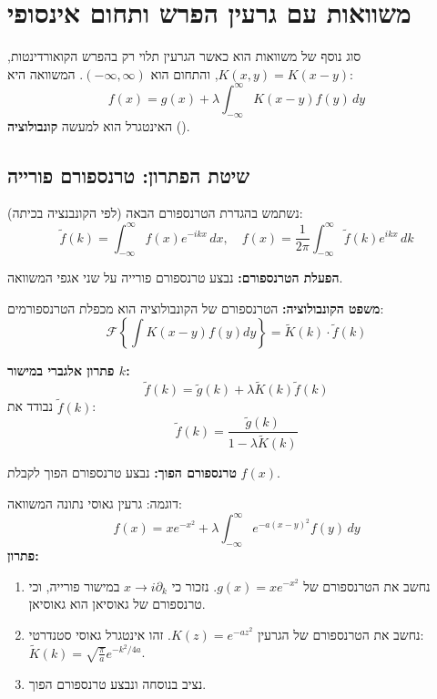 \section{משוואות עם גרעין הפרש ותחום אינסופי}

סוג נוסף של משוואות הוא כאשר הגרעין תלוי רק בהפרש הקואורדינטות, $K(x,y) = K(x-y)$, והתחום הוא $(-\infty, \infty)$.
המשוואה היא:
\[
f(x) = g(x) + \lambda \int_{-\infty}^{\infty} K(x-y) f(y) \, dy
\]
האינטגרל הוא למעשה \textbf{קונבולוציה} ().

\subsection{שיטת הפתרון: טרנספורם פורייה}

נשתמש בהגדרת הטרנספורם הבאה (לפי הקונבנציה בכיתה):
\[
\tilde{f}(k) = \int_{-\infty}^{\infty} f(x) e^{-ikx} \, dx, \quad f(x) = \frac{1}{2\pi} \int_{-\infty}^{\infty} \tilde{f}(k) e^{ikx} \, dk
\]

\begin{steps}
\item \textbf{הפעלת הטרנספורם:} נבצע טרנספורם פורייה על שני אגפי המשוואה.
\item \textbf{משפט הקונבולוציה:} הטרנספורם של הקונבולוציה הוא מכפלת הטרנספורמים:
\[
\mathcal{F}\left\{ \int K(x-y)f(y)dy \right\} = \tilde{K}(k) \cdot \tilde{f}(k)
\]
\item \textbf{פתרון אלגברי במישור $k$:}
\[
\tilde{f}(k) = \tilde{g}(k) + \lambda \tilde{K}(k) \tilde{f}(k)
\]
נבודד את $\tilde{f}(k)$:
\[
\boxed{\tilde{f}(k) = \frac{\tilde{g}(k)}{1 - \lambda \tilde{K}(k)}}
\]
\item \textbf{טרנספורם הפוך:} נבצע טרנספורם הפוך לקבלת $f(x)$.
\end{steps}

\begin{examplebox}{דוגמה: גרעין גאוסי}
נתונה המשוואה:
\[
f(x) = x e^{-x^2} + \lambda \int_{-\infty}^{\infty} e^{-a(x-y)^2} f(y) \, dy
\]
\textbf{פתרון:}
\begin{enumerate}
    \item נחשב את הטרנספורם של $g(x) = x e^{-x^2}$. נזכור כי $x \to i \partial_k$ במישור פורייה, וכי טרנספורם של גאוסיאן הוא גאוסיאן.
    \item נחשב את הטרנספורם של הגרעין $K(z) = e^{-az^2}$. זהו אינטגרל גאוסי סטנדרטי: $\tilde{K}(k) = \sqrt{\frac{\pi}{a}} e^{-k^2/4a}$.
    \item נציב בנוסחה ונבצע טרנספורם הפוך.
\end{enumerate}
\end{examplebox}

